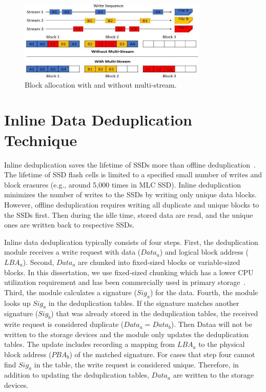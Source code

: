 \begin{figure}[t]
	\centering
	\includegraphics[width=0.8\textwidth]{figure/background/multistream}
	\caption{Block allocation with and without multi-stream.}
	\label{fig:multistream}
\end{figure}


\section{Inline Data Deduplication Technique}
Inline deduplication saves the lifetime of SSDs more than
offline deduplication~\cite{InlineDedup}. The lifetime of SSD flash cells is limited to a
specified small number of writes and block erasures (e.g., around
5,000 times in MLC SSD). Inline deduplication minimizes the number
of writes to the SSDs by writing only unique data blocks. However,
offline deduplication requires writing all duplicate and unique blocks
to the SSDs first. Then during the idle time, stored data are read, and
the unique ones are written back to respective SSDs.

Inline data deduplication typically consists of four steps. First, the
deduplication module receives a write request with data ($Data_a$)
and logical block address ($LBA_a$). Second, $Data_a$ are chunked into
fixed-sized blocks or variable-sized blocks. In this dissertation, we use
fixed-sized chunking which has a lower CPU utilization requirement
and has been commercially used in primary storage~\cite{InlineDedup}.
Third, the module calculates a signature ($Sig_a$) for the data. Fourth,
the module looks up $Sig_a$ in the deduplication tables. If the
signature matches another signature ($Sig_b$) that was already stored
in the deduplication tables, the received write request is considered
duplicate ($Data_a = Data_b$). Then Dataa will not be written to the
storage devices and the module only updates the deduplication
tables. The update includes recording a mapping from $LBA_a$ to the
physical block address ($PBA_b$) of the matched signature. For cases
that step four cannot find $Sig_a$ in the table, the write request is considered
unique. Therefore, in addition to updating the deduplication
tables, $Data_a$ are written to the storage devices.

